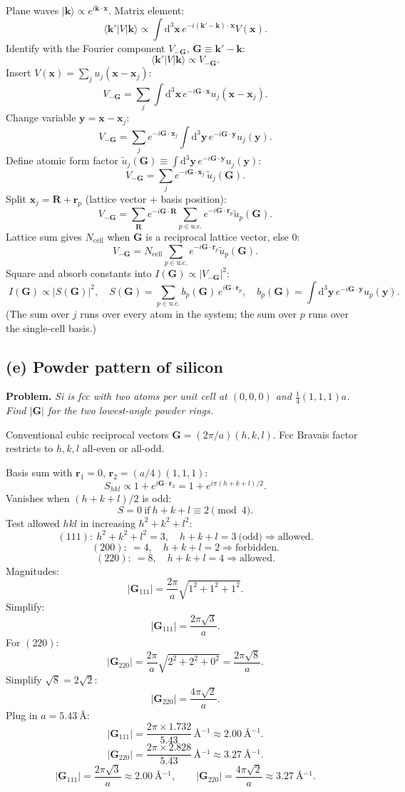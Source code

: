 \documentclass[11pt]{article}
\newcommand{\de}{\mathrm{d}}
\begin{document}
Plane waves $|\bm k\rangle\propto e^{i\bm k\cdot\bm x}$. Matrix element:
\[
\langle\bm k'|V|\bm k\rangle \propto \int\de^3\bm x\, e^{-i(\bm k'-\bm k)\cdot\bm x}V(\bm x).
\]
Identify with the Fourier component $V_{-\bm G}$, $\bm G\equiv\bm k'-\bm k$:
\[
\langle\bm k'|V|\bm k\rangle \propto V_{-\bm G}.
\]
Insert $V(\bm x)=\sum_j u_j(\bm x-\bm x_j)$:
\[
V_{-\bm G} = \sum_j\int\de^3\bm x\, e^{-i\bm G\cdot\bm x}u_j(\bm x-\bm x_j).
\]
Change variable $\bm y=\bm x-\bm x_j$:
\[
V_{-\bm G} = \sum_j e^{-i\bm G\cdot\bm x_j}\int\de^3\bm y\, e^{-i\bm G\cdot\bm y}u_j(\bm y).
\]
Define atomic form factor $\tilde u_j(\bm G)\equiv\int\de^3\bm y\, e^{-i\bm G\cdot\bm y}u_j(\bm y)$:
\[
V_{-\bm G} = \sum_j e^{-i\bm G\cdot\bm x_j}\,\tilde u_j(\bm G).
\]
Split $\bm x_j=\bm R + \bm r_p$ (lattice vector + basis position):
\[
V_{-\bm G} = \sum_{\bm R} e^{-i\bm G\cdot\bm R}\sum_{p\in\text{u.c.}} e^{-i\bm G\cdot\bm r_p}\tilde u_p(\bm G).
\]
Lattice sum gives $N_{\text{cell}}$ when $\bm G$ is a reciprocal lattice vector, else $0$:
\[
V_{-\bm G} = N_{\text{cell}}\sum_{p\in\text{u.c.}} e^{-i\bm G\cdot\bm r_p}\tilde u_p(\bm G).
\]
Square and absorb constants into $I(\bm G)\propto|V_{-\bm G}|^2$:
\[
\boxed{\;I(\bm G)\propto |S(\bm G)|^2,\quad S(\bm G)=\sum_{p\in\text{u.c.}} b_p(\bm G)\, e^{i\bm G\cdot\bm r_p},\quad b_p(\bm G)=\int\de^3\bm y\, e^{-i\bm G\cdot\bm y}u_p(\bm y).\;}
\]
(The sum over $j$ runs over every atom in the system; the sum over $p$ runs over the single-cell basis.)

\subsection*{(e) Powder pattern of silicon}

\textbf{Problem.} \emph{Si is fcc with two atoms per unit cell at $(0,0,0)$ and $\tfrac14(1,1,1)a$. Find $|\bm G|$ for the two lowest-angle powder rings.}

Conventional cubic reciprocal vectors $\bm G=(2\pi/a)(h,k,l)$. Fcc Bravais factor restricts to $h,k,l$ all-even or all-odd.

Basis sum with $\bm r_1 = 0$, $\bm r_2 = (a/4)(1,1,1)$:
\[
S_{hkl} \propto 1 + e^{i\bm G \cdot \bm r_2} = 1 + e^{i\pi(h+k+l)/2}.
\]
Vanishes when $(h+k+l)/2$ is odd:
\[
S=0\ \text{if}\ h+k+l\equiv 2\pmod 4.
\]
Test allowed $hkl$ in increasing $h^2+k^2+l^2$:
\[
(111):\ h^2+k^2+l^2=3,\quad h+k+l=3\ \text{(odd)} \Rightarrow \text{allowed}.
\]
\[
(200):\ =4,\quad h+k+l=2 \Rightarrow \text{forbidden}.
\]
\[
(220):\ =8,\quad h+k+l=4 \Rightarrow \text{allowed}.
\]
Magnitudes:
\[
|\bm G_{111}| = \frac{2\pi}{a}\sqrt{1^2+1^2+1^2}.
\]
Simplify:
\[
|\bm G_{111}| = \frac{2\pi\sqrt 3}{a}.
\]
For $(220)$:
\[
|\bm G_{220}| = \frac{2\pi}{a}\sqrt{2^2+2^2+0^2} = \frac{2\pi\sqrt 8}{a}.
\]
Simplify $\sqrt 8 = 2\sqrt 2$:
\[
|\bm G_{220}| = \frac{4\pi\sqrt 2}{a}.
\]
Plug in $a=\SI{5.43}{\angstrom}$:
\[
|\bm G_{111}| = \frac{2\pi\times 1.732}{5.43}\,\si{\angstrom^{-1}} \approx \SI{2.00}{\angstrom^{-1}}.
\]
\[
|\bm G_{220}| = \frac{2\pi\times 2.828}{5.43}\,\si{\angstrom^{-1}} \approx \SI{3.27}{\angstrom^{-1}}.
\]
\[
\boxed{\;|\bm G_{111}|=\frac{2\pi\sqrt 3}{a}\approx\SI{2.00}{\angstrom^{-1}},\qquad |\bm G_{220}|=\frac{4\pi\sqrt 2}{a}\approx\SI{3.27}{\angstrom^{-1}}.\;}
\]
\end{document}
